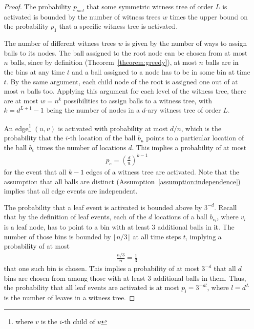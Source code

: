 \documentclass[a4paper,12pt]{article}
\begin{document}
\begin{proof}
The probability $p_{swt}$ that some symmetric witness tree of order $L$ is activated is bounded by the number of witness trees $w$ times the upper bound on the probability $p_1$ that a specific witness tree is activated.

The number of different witness trees $w$ is given by the number of ways to assign balls to its nodes. The ball assigned to the root node can be chosen from at most $n$ balls, since by definition (Theorem~\ref{theorem:greedy}), at most $n$ balls are in the bins at any time $t$ and a ball assigned to a node has to be in some bin at time $t$. By the same argument, each child node of the root is assigned one out of at most $n$ balls too. Applying this argument for each level of the witness tree, there are at most $w = n^k$ possibilities to assign balls to a witness tree, with $k = d^{L+1}-1$ being the number of nodes in a $d$-ary witness tree of order $L$.
 
An edge\footnote{where $v$ is the $i$-th child of $u$} $(u, v)$ is activated with probability at most $d/n$, which is the probability that the $i$-th location of the ball $b_u$ points to a particular location of the ball $b_v$ times the number of locations $d$. This implies a probability of at most
\begin{align*}
p_e = \left(\frac{d}{n}\right)^{k-1}
\end{align*} 
for the event that all $k-1$ edges of a witness tree are activated. Note that  the assumption that all balls are distinct (Assumption~\ref{assumption:independence}) implies that all edge events are independent.

The probability that a leaf event is activated is bounded above by $3^{-d}$. Recall that by the definition of leaf events, each of the $d$ locations of a ball $b_{v_l}$, where $v_l$ is a leaf node, has to point to a bin with at least 3 additional balls in it. The number of those bins is bounded by $\lfloor n/3 \rfloor$ at all time steps $t$, implying a probability of at most 
\begin{align*}
\frac{n/3}{n} = \frac{1}{3}
\end{align*}
that one such bin is chosen. This implies a probability of at most $3^{-d}$ that all $d$ bins are chosen from among those with at least 3 additional balls in them. Thus, the probability that all leaf events are activated is at most $p_l = 3^{-d l}$, where $l = d^{L}$ is the number of leaves in a witness tree.


\end{proof}
\end{document}
